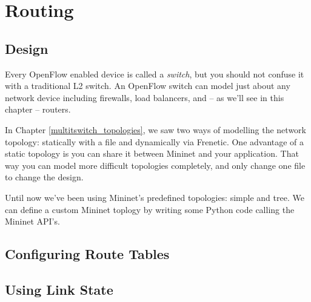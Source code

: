 \chapter{Routing}

\section{Design}
\label{routing:design}

Every OpenFlow enabled device is called a \emph{switch}, but you should not confuse it
with a traditional L2 switch.  An OpenFlow switch can model just about any network device
including firewalls, load balancers, and -- as we'll see in this chapter -- routers.  

In Chapter \ref{multitswitch_topologies}, we saw two ways of modelling the network topology:
statically with a  file and dynamically via Frenetic.  One advantage of a
static topology is you can share it between Mininet and your application.  That 
way you can model more difficult topologies completely, and only change one file
to change the design.  

Until now we've been using Mininet's predefined topologies: simple and tree.  We
can define a custom Mininet toplogy by writing some Python code calling the Mininet
API's.  

\section{Configuring Route Tables}

\section{Using Link State}

